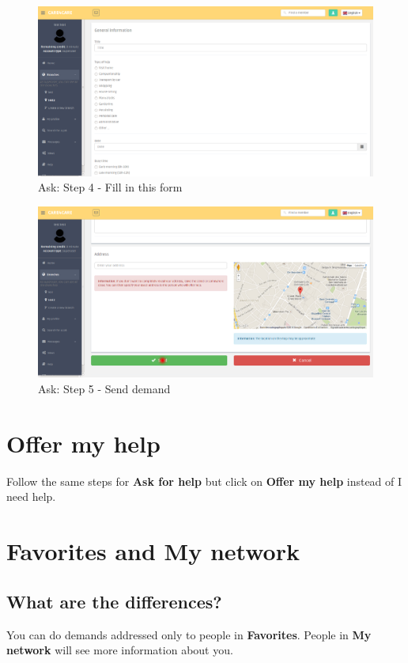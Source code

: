 \documentclass{article}
\begin{document}
\begin{figure}[!ht]
   \includegraphics[width=\textwidth]{img/dem4.png}
   \caption{Ask: Step 4 - Fill in this form}
\end{figure}
\begin{figure}[!ht]
   \includegraphics[width=\textwidth]{img/dem5.png}
   \caption{Ask: Step 5 - Send demand}
\end{figure}

\clearpage
\section{Offer my help}
Follow the same steps for \textbf{Ask for help} but click on \textbf{Offer my help} instead of I need help.


\section{Favorites and My network}
\subsection{What are the differences?}
You can do demands addressed only to people in \textbf{Favorites}.
People in \textbf{My network} will see more information about you.
\end{document}
